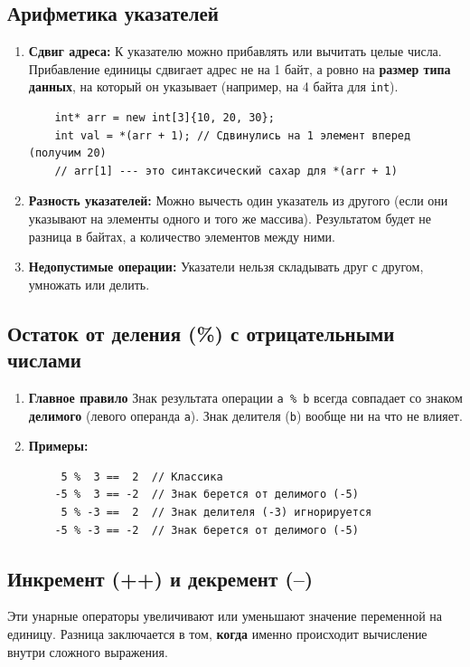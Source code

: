 \documentclass[a4paper, 12pt]{article}
\newcommand{\term}[1]{\textbf{#1}} %
\newcommand{\code}[1]{\texttt{#1}} %
\begin{document}
\subsection*{Арифметика указателей}
\begin{enumerate}
    \item \term{Сдвиг адреса:} К указателю можно прибавлять или вычитать целые числа. Прибавление единицы сдвигает адрес не на 1 байт, а ровно на \textbf{размер типа данных}, на который он указывает (например, на 4 байта для \code{int}).
    \begin{verbatim}
    int* arr = new int[3]{10, 20, 30};
    int val = *(arr + 1); // Сдвинулись на 1 элемент вперед (получим 20)
    // arr[1] --- это синтаксический сахар для *(arr + 1)
    \end{verbatim}

    \item \term{Разность указателей:} Можно вычесть один указатель из другого (если они указывают на элементы одного и того же массива). Результатом будет не разница в байтах, а количество элементов между ними.
    
    \item \term{Недопустимые операции:} Указатели нельзя складывать друг с другом, умножать или делить.
\end{enumerate}

\subsection*{Остаток от деления (\%) с отрицательными числами}
\begin{enumerate}
    \item \term{Главное правило} Знак результата операции \code{a \% b} всегда совпадает со знаком \textbf{делимого} (левого операнда \code{a}). Знак делителя (\code{b}) вообще ни на что не влияет.
    \item \term{Примеры:}
    \begin{verbatim}
     5 %  3 ==  2  // Классика
    -5 %  3 == -2  // Знак берется от делимого (-5)
     5 % -3 ==  2  // Знак делителя (-3) игнорируется
    -5 % -3 == -2  // Знак берется от делимого (-5)
    \end{verbatim}
\end{enumerate}

\subsection*{Инкремент (++) и декремент (--)}
Эти унарные операторы увеличивают или уменьшают значение переменной на единицу. Разница заключается в том, \textbf{когда} именно происходит вычисление внутри сложного выражения.
\end{document}

